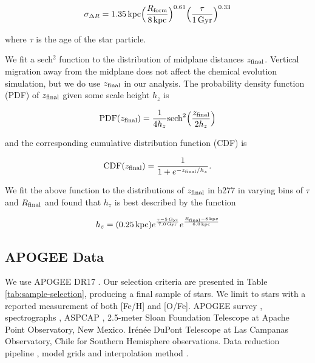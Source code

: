 \documentclass[twocolumn,linenumbers,twocolappendix]{aastex631}
\begin{document}
\begin{equation}
    \sigma_{\Delta R} = 1.35\,{\rm kpc} \Big(\frac{R_{\rm form}}{8\,{\rm kpc}}\Big)^{0.61} \Big(\frac{\tau}{1\,{\rm Gyr}}\Big)^{0.33}
    \label{eq:radial-migration}
\end{equation}

\noindent where $\tau$ is the age of the star particle. 

We fit a sech$^2$ function \citep{Spitzer1942} to the distribution of midplane distances $z_{\rm final}$. Vertical migration away from the midplane does not affect the chemical evolution simulation, but we do use $z_{\rm final}$ in our analysis. The probability density function (PDF) of $z_{\rm final}$ given some scale height $h_z$ is

\begin{equation}
    {\rm PDF}(z_{\rm final}) = \frac{1}{4 h_z} {\rm sech}^2\Big(\frac{z_{\rm final}}{2 h_z}\Big)
    \label{eq:sech-pdf}
\end{equation}

\noindent and the corresponding cumulative distribution function (CDF) is

\begin{equation}
    {\rm CDF}(z_{\rm final}) = \frac{1}{1 + e^{-z_{\rm final} / h_z}}.
    \label{eq:sech-cdf}
\end{equation}

\noindent We fit the above function to the distributions of $z_{\rm final}$ in h277 in varying bins of $\tau$ and $R_{\rm final}$ and found that $h_z$ is best described by the function

\begin{equation}
    h_z = (0.25\,{\rm kpc}) 
    e^{\frac{\tau-5\,{\rm Gyr}}{7.0\,{\rm Gyr}}}
    e^{\frac{R_{\rm final}-8\,{\rm kpc}}{6.0\,{\rm kpc}}}
    \label{eq:scale-height}
\end{equation}

\subsection{APOGEE Data}
\label{sec:apogee-data}

We use APOGEE DR17 \citep{Abdurro'uf2022-SDSSIV-DR17}. Our selection criteria are presented in Table \ref{tab:sample-selection}, producing a final sample of  stars. We limit to stars with a reported measurement of both [Fe/H] and [O/Fe]. APOGEE survey \citep{Majewski2017-APOGEE}, spectrographs \citep{Wilson2019-APOGEE-Spectrographs}, ASPCAP \citep{Holtzmann2015-ASPCAP,GarciaPerez2016-ASPCAP}, 2.5-meter Sloan Foundation Telescope \citep{Gunn2006-SloanTelescope} at Apache Point Observatory, New Mexico. Ir{\'e}n{\'e}e DuPont Telescope \citep{BowenVaughan1973-DuPontTelescope} at Las Campanas Observatory, Chile for Southern Hemisphere observations. Data reduction pipeline \citep{Nidever2015-APOGEE-DataReduction}, model grids and interpolation method \citep{Jonsson2020-APOGEE-DR16}.
\end{document}
